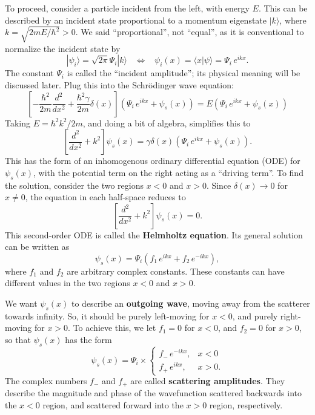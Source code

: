 \documentclass[pra,12pt]{revtex4}
\begin{document}
To proceed, consider a particle incident from the left, with energy
$E$.  This can be described by an incident state proportional to a
momentum eigenstate $|k\rangle$, where $k = \sqrt{2mE/\hbar^2} > 0$.
We said ``proportional'', not ``equal'', as it is conventional to
normalize the incident state by
\begin{equation}
  |\psi_i\rangle = \sqrt{2\pi}\Psi_i |k\rangle \;\;\; \Leftrightarrow\;\;\; \psi_i(x) = \langle x|\psi\rangle = \Psi_i \, e^{ik x}.
\end{equation}
The constant $\Psi_i$ is called the ``incident amplitude''; its
physical meaning will be discussed later.  Plug this into the
Schr\"odinger wave equation:
\begin{equation}
  \left[-\frac{\hbar^2}{2m} \frac{d^2}{dx^2} + \frac{\hbar^2\gamma}{2m}\delta(x)\right] \left(\Psi_i \, e^{ikx} + \psi_s(x) \right) = E \left(\Psi_i \, e^{ikx} + \psi_s(x) \right)
\end{equation}
Taking $E = \hbar^2k^2/2m$, and doing a bit of algebra, simplifies this to
\begin{equation}
  \left[ \frac{d^2}{dx^2} + k^2\right] \psi_s(x) =  \gamma \delta(x) \left(\Psi_i \, e^{ikx} + \psi_s(x) \right).
\end{equation}
This has the form of an inhomogenous ordinary differential equation (ODE)
for $\psi_s(x)$, with the potential term on the right acting
as a ``driving term''.  To find the solution, consider the two regions $x <
0$ and $x > 0$.  Since $\delta(x) \rightarrow 0$ for $x \ne 0$, the
equation in each half-space reduces to
\begin{equation}
  \left[\frac{d^2}{dx^2} + k^2\right] \psi_s(x) = 0.
\end{equation}
This second-order ODE is called the \textbf{Helmholtz equation}.  Its
general solution can be written as
\begin{equation}
  \psi_s(x) = \Psi_i \left(f_1 \, e^{ik x} + f_2 \, e^{-ik x}\right),
\end{equation}
where $f_1$ and $f_2$ are arbitrary complex constants.  These
constants can have different values in the two regions $x < 0$ and $x
> 0$.

We want $\psi_s(x)$ to describe an \textbf{outgoing wave}, moving away
from the scatterer towards infinity.  So, it should be purely
left-moving for $x < 0$, and purely right-moving for $x > 0$.  To
achieve this, we let $f_1 = 0$ for $x < 0$, and $f_2 = 0$ for $x > 0$,
so that $\psi_s(x)$ has the form
\begin{equation}
  \psi_s(x) = \Psi_i \times \begin{cases}f_- \,e^{-ikx}, & x < 0 \\ f_+ \,e^{ikx}, & x > 0.\end{cases}
\end{equation}
The complex numbers $f_-$ and $f_+$ are called \textbf{scattering
  amplitudes}.  They describe the magnitude and phase of the
wavefunction scattered backwards into the $x<0$ region, and scattered
forward into the $x > 0$ region, respectively.
\end{document}
